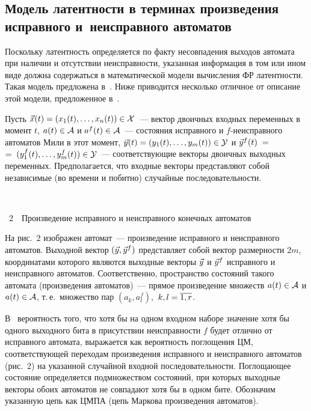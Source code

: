 \begin{multicols}{2}

\subsection{Модель латентности в терминах произведения исправного
и~неисправного автоматов}

 Поскольку латентность определяется по факту несовпадения выходов
автомата при наличии и отсутствии неисправности, указанная информация в том
или ином виде должна содержаться в математической модели вычисления ФР
латентности.
Такая модель предложена в~\cite{4}.
Ниже приводится несколько отличное от \cite{4} описание этой модели,
предложенное в~\cite{5}.

Пусть $\vec x(t) = (x_1(t),\ldots,x_n(t))\in {\cal X}$~--- вектор двоичных
входных переменных в момент $t$,
$a(t)\in {\cal A}$ и $a^f(t)\in {\cal A}$~--- состояния исправ\-ного и
$f$-неисправ\-ного автоматов Мили в этот момент,
$\vec y(t)=(y_1(t),\ldots,y_m(t))\in {\cal Y}$ и
$\vec y^f(t)\;=$\linebreak $=\;(y^f_1(t),\ldots,y^f_m(t))\in {\cal Y}$~---
соответствующие векторы двоичных выходных переменных.
Предполагается, что входные векторы представляют
собой независимые (во времени и побитно) случайные последовательности.

\begin{center}
\vspace*{6pt}
\mbox{%
\epsfxsize=73.815mm
}
\end{center}
{{\figurename~2}\ \ \small{Произведение исправного и неисправного конечных автоматов}}

\bigskip
\medskip
\addtocounter{figure}{1}

 На рис.~2 изображен автомат~--- произведение исправного и
неисправного автоматов.
Выходной вектор $(\vec y,\vec y^f)$ представляет собой вектор раз\-мер\-ности $2m$,
координатами которого являются выходные векторы $\vec y$ и $\vec y^f$
исправного и неисправного автоматов.
Соответственно, пространство состояний такого автомата (произведения
автоматов)~--- прямое произведение множеств $a(t)\in {\cal A}$ и
$a(t)\in {\cal A}$, т.\,е.\ множество пар $(a_k,a^f_l)$,\ $k,l=\overline{1,r}$.

В~\cite{4} вероятность того, что хотя бы на одном входном наборе значение хотя бы
одного выходного бита в присутствии неисправности $f$ будет отлично от
исправного автомата, выражается как вероятность поглощения ЦМ,
соответствующей переходам произведения исправного и неисправного
автоматов (рис.~2) на указанной случайной входной последовательности.
Поглощающее состояние определяется подмножеством состояний, при которых
выходные векторы обоих автоматов не совпадают хотя бы в одном бите.
Обозначим указанную
цепь как ЦМПА (цепь Маркова произведения автоматов).



\end{multicols}
